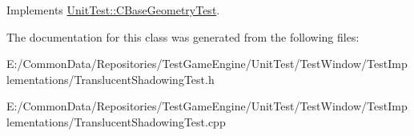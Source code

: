 Implements \mbox{\hyperlink{class_unit_test_1_1_c_base_geometry_test_afe9560d667ef457f7a203453c10593fd}{Unit\+Test\+::\+C\+Base\+Geometry\+Test}}.



The documentation for this class was generated from the following files\+:\begin{DoxyCompactItemize}
\item 
E\+:/\+Common\+Data/\+Repositories/\+Test\+Game\+Engine/\+Unit\+Test/\+Test\+Window/\+Test\+Implementations/Translucent\+Shadowing\+Test.\+h\item 
E\+:/\+Common\+Data/\+Repositories/\+Test\+Game\+Engine/\+Unit\+Test/\+Test\+Window/\+Test\+Implementations/Translucent\+Shadowing\+Test.\+cpp\end{DoxyCompactItemize}
